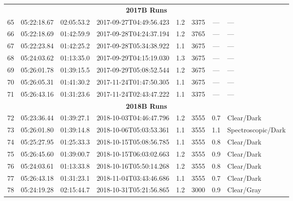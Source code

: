 \documentclass[12pt]{article}
\begin{document}
\begin{table}
\begin{center}
\begin{threeparttable}
\begin{tabular}{lccccccl}
	\multicolumn{8}{c}{{\bf 2017B Runs}} \\
	65 & 05:22:18.67 & 02:05:53.2 & 2017-09-27T04:49:56.423 & 1.2  & 3375 & ---      & ---                 \\
	66 & 05:22:18.69 & 01:42:59.9 & 2017-09-28T04:24:37.194 & 1.2  & 3765 & ---      & ---                 \\
	67 & 05:22:23.84 & 01:42:25.2 & 2017-09-28T05:34:38.922 & 1.1  & 3675 & ---      & ---                 \\
	68 & 05:24:03.62 & 01:13:35.0 & 2017-09-29T04:15:19.030 & 1.3  & 3675 & ---      & ---                 \\
	69 & 05:26:01.78 & 01:39:15.5 & 2017-09-29T05:08:52.544 & 1.2  & 3675 & ---      & ---                 \\
	70 & 05:26:05.31 & 01:41:30.2 & 2017-11-24T01:47:50.305 & 1.1  & 3675 & ---      & ---                 \\
	71 & 05:26:43.16 & 01:31:23.6 & 2017-11-24T02:43:47.222 & 1.1  & 3375 & ---      & ---                 \\
	\multicolumn{8}{c}{{\bf 2018B Runs}} \\
	72 & 05:23:36.44 & 01:39:27.1 & 2018-10-03T04:46:47.796 & 1.2  & 3555 & 0.7      & Clear/Dark          \\
	73 & 05:26:01.80 & 01:39:14.8 & 2018-10-06T05:03:53.361 & 1.1  & 3555 & 1.1      & Spectroscopic/Dark  \\
	74 & 05:25:27.95 & 01:25:33.3 & 2018-10-15T05:08:56.785 & 1.1  & 3555 & 0.8      & Clear/Dark          \\
	75 & 05:26:45.60 & 01:39:00.7 & 2018-10-15T06:03:02.663 & 1.2  & 3555 & 0.9      & Clear/Dark          \\
	76 & 05:24:03.61 & 01:13:33.8 & 2018-10-16T05:50:14.268 & 1.2  & 3555 & 0.8      & Clear/Dark          \\
	77 & 05:26:43.18 & 01:31:23.1 & 2018-11-04T03:43:46.686 & 1.1  & 3555 & 0.7      & Clear/Dark          \\
	78 & 05:24:19.28 & 02:15:44.7 & 2018-10-31T05:21:56.865 & 1.2  & 3000 & 0.9      & Clear/Gray          \\
	\bottomrule
	\end{tabular}
 \end{threeparttable}
\end{center}
\end{table}
\end{document}
